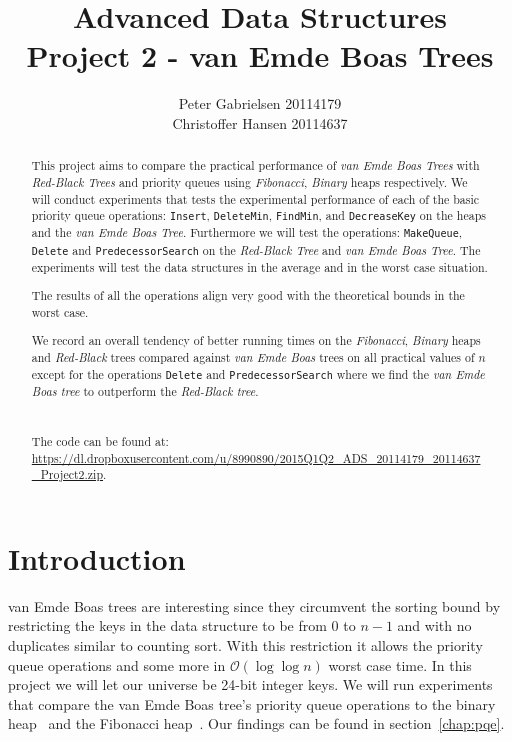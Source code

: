 \documentclass[a4paper,oneside,article,11pt]{memoir}
\title{Advanced Data Structures \\ Project 2 - van Emde Boas Trees}
\author{Peter Gabrielsen 20114179 \\
Christoffer Hansen 20114637}
\begin{document}
\begin{titlingpage}
\clearpage

\maketitle
\thispagestyle{empty}

\begin{abstract}
This project aims to compare the practical performance of \textit{van Emde Boas Trees} with \textit{Red-Black Trees} and priority queues using \textit{Fibonacci}, \textit{Binary} heaps respectively. We will conduct experiments that tests the experimental performance of each of the basic priority queue operations: \texttt{Insert}, \texttt{DeleteMin}, \texttt{FindMin}, and \texttt{DecreaseKey} on the heaps and the \textit{van Emde Boas Tree}. Furthermore we will test the operations: 
\texttt{MakeQueue}, \texttt{Delete} and \texttt{PredecessorSearch} on the \textit{Red-Black Tree} and \textit{van Emde Boas Tree}.
The experiments will test the data structures in the average and in the worst case situation.

The results of all the operations align very good with the theoretical bounds in the worst case.

We record an overall tendency of better running times on the \textit{Fibonacci}, \textit{Binary} heaps and \textit{Red-Black} trees compared against \textit{van Emde Boas} trees on all practical values of $n$ except for the operations \texttt{Delete} and \texttt{PredecessorSearch} where we find the \textit{van Emde Boas tree} to outperform the \textit{Red-Black tree}. %
\\
\\
\\
The code can be found at: \\\url{https://dl.dropboxusercontent.com/u/8990890/2015Q1Q2_ADS_20114179_20114637_Project2.zip}.
\end{abstract}
\end{titlingpage}

\pagebreak

\tableofcontents

\pagebreak

\chapter{Introduction}
van Emde Boas trees are interesting since they circumvent the sorting bound by restricting the keys in the data structure to be from $0$ to $n-1$ and with no duplicates similar to counting sort. With this restriction it allows the priority queue operations and some more in $\mathcal{O}(\log\log n)$ worst case time. In this project we will let our universe be 24-bit integer keys. We will run experiments that compare the van Emde Boas tree's priority queue operations to the binary heap~\cite{williams} and the Fibonacci heap~\cite{fred87}. Our findings can be found in section~\ref{chap:pqe}.
\end{document}
